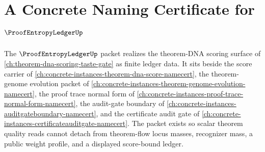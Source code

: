 \chapter{A Concrete Naming Certificate for $\ProofEntropyLedgerUp$}
\label{ch:concrete-instances-proof-entropy-ledger-namecert}

The $\ProofEntropyLedgerUp$ packet realizes the theorem-DNA scoring surface of \autoref{ch:theorem-dna-scoring-taste-gate} as finite ledger data. It sits beside the score carrier of \autoref{ch:concrete-instances-theorem-dna-score-namecert}, the theorem-genome evolution packet of \autoref{ch:concrete-instances-theorem-genome-evolution-namecert}, the proof trace normal form of \autoref{ch:concrete-instances-proof-trace-normal-form-namecert}, the audit-gate boundary of \autoref{ch:concrete-instances-auditgateboundary-namecert}, and the certificate audit gate of \autoref{ch:concrete-instances-certificateauditgate-namecert}. The packet exists so scalar theorem quality reads cannot detach from theorem-flow locus masses, recognizer mass, a public weight profile, and a displayed score-bound ledger.


